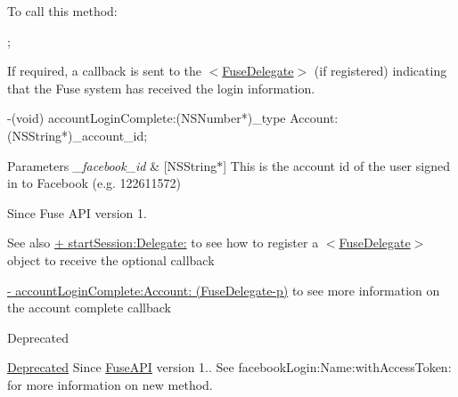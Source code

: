 To call this method\+:


\begin{DoxyCode}
;
\end{DoxyCode}


If required, a callback is sent to the $<$\hyperlink{protocol_fuse_delegate-p}{Fuse\+Delegate}$>$ (if registered) indicating that the Fuse system has received the login information.


\begin{DoxyCode}
-(void) accountLoginComplete:(NSNumber*)\_type Account:(NSString*)\_account\_id;
\end{DoxyCode}



\begin{DoxyParams}{Parameters}
{\em \+\_\+facebook\+\_\+id} & \mbox{[}N\+S\+String$\ast$\mbox{]} This is the account id of the user signed in to Facebook (e.\+g. 122611572) \\
\hline
\end{DoxyParams}
\begin{DoxySince}{Since}
Fuse A\+P\+I version 1. 
\end{DoxySince}
\begin{DoxySeeAlso}{See also}
\hyperlink{interface_fuse_a_p_i_aab1649c81002a336ca872da6fef36b8d}{+ start\+Session\+:\+Delegate\+:} to see how to register a $<$\hyperlink{protocol_fuse_delegate-p}{Fuse\+Delegate}$>$ object to receive the optional callback 

\hyperlink{protocol_fuse_delegate-p_a54a18530604a7ceeb0e9419fc7fa3345}{-\/ account\+Login\+Complete\+:\+Account\+: (\+Fuse\+Delegate-\/p)} to see more information on the account complete callback 
\end{DoxySeeAlso}
\begin{DoxyRefDesc}{Deprecated}
\item[\hyperlink{deprecated__deprecated000004}{Deprecated}]Since \hyperlink{interface_fuse_a_p_i}{Fuse\+A\+P\+I} version 1.. See facebook\+Login\+:\+Name\+:with\+Access\+Token\+: for more information on new method. \end{DoxyRefDesc}
\hypertarget{interface_fuse_a_p_i_a38487be821059910b1b939d818cd0e9f}{}
